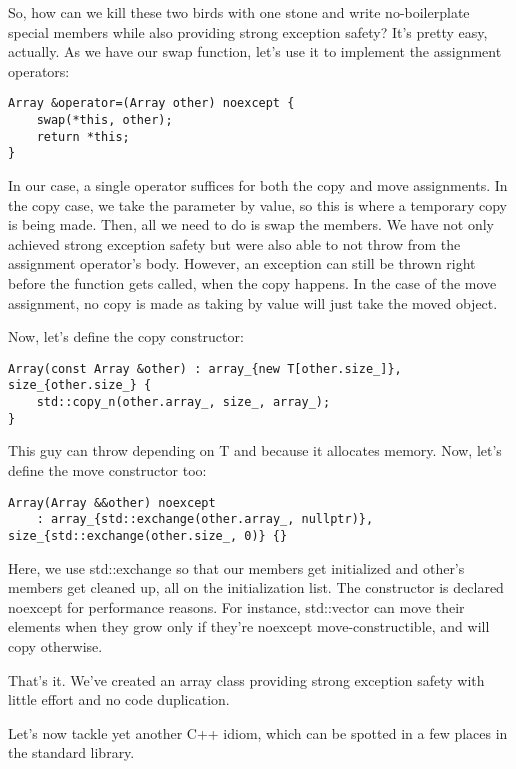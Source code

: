 So, how can we kill these two birds with one stone and write no-boilerplate special members while also providing strong exception safety? It's pretty easy, actually. As we have our swap function, let's use it to implement the assignment operators:

\begin{lstlisting}[style=styleCXX]
Array &operator=(Array other) noexcept {
	swap(*this, other);
	return *this;
}
\end{lstlisting}

In our case, a single operator suffices for both the copy and move assignments. In the copy case, we take the parameter by value, so this is where a temporary copy is being made. Then, all we need to do is swap the members. We have not only achieved strong exception safety but were also able to not throw from the assignment operator's body. However, an exception can still be thrown right before the function gets called, when the copy happens. In the case of the move assignment, no copy is made as taking by value will just take the moved object.

Now, let's define the copy constructor:

\begin{lstlisting}[style=styleCXX]
Array(const Array &other) : array_{new T[other.size_]},
size_{other.size_} {
	std::copy_n(other.array_, size_, array_);
}
\end{lstlisting}

This guy can throw depending on T and because it allocates memory. Now, let's define the move constructor too:

\begin{lstlisting}[style=styleCXX]
Array(Array &&other) noexcept
	: array_{std::exchange(other.array_, nullptr)},
size_{std::exchange(other.size_, 0)} {}
\end{lstlisting}

Here, we use std::exchange so that our members get initialized and other's members get cleaned up, all on the initialization list. The constructor is declared noexcept for performance reasons. For instance, std::vector can move their elements when they grow only if they're noexcept move-constructible, and will copy otherwise.

That's it. We've created an array class providing strong exception safety with little effort and no code duplication.

Let's now tackle yet another C++ idiom, which can be spotted in a few places in the standard library.

